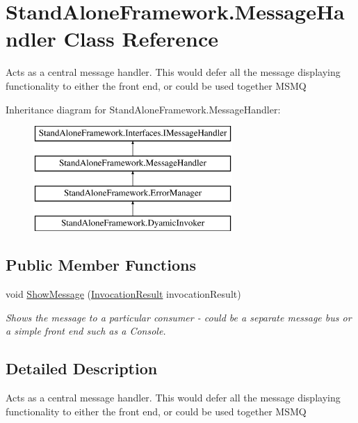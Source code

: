 \hypertarget{class_stand_alone_framework_1_1_message_handler}{\section{Stand\+Alone\+Framework.\+Message\+Handler Class Reference}
\label{class_stand_alone_framework_1_1_message_handler}
}


Acts as a central message handler. This would defer all the message displaying functionality to either the front end, or could be used together M\+S\+M\+Q  


Inheritance diagram for Stand\+Alone\+Framework.\+Message\+Handler\+:\begin{figure}[H]
\begin{center}
\leavevmode
\includegraphics[height=4.000000cm]{class_stand_alone_framework_1_1_message_handler}
\end{center}
\end{figure}
\subsection*{Public Member Functions}
\begin{DoxyCompactItemize}
\item 
void \hyperlink{class_stand_alone_framework_1_1_message_handler_af3c85f52f95dcfb2d10edc8238cf885e}{Show\+Message} (\hyperlink{class_stand_alone_framework_1_1_framework_classes_1_1_invocation_result}{Invocation\+Result} invocation\+Result)
\begin{DoxyCompactList}\small\item\em Shows the message to a particular consumer -\/ could be a separate message bus or a simple front end such as a Console. \end{DoxyCompactList}\end{DoxyCompactItemize}


\subsection{Detailed Description}
Acts as a central message handler. This would defer all the message displaying functionality to either the front end, or could be used together M\+S\+M\+Q 



